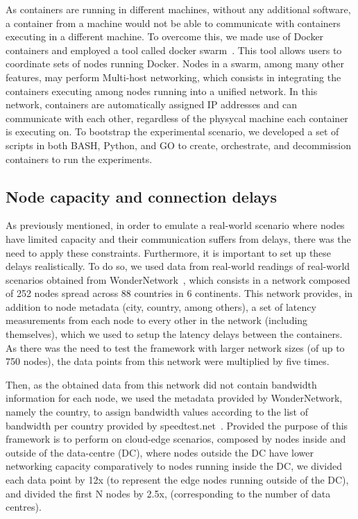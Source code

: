 As containers are running in different machines, without any additional software, a container from a machine would not be able to communicate with containers executing in a different machine. To overcome this, we made use of Docker~\cite{docker} containers and employed a tool called docker swarm~\cite{docker-swarm}. This tool allows users to coordinate sets of nodes running Docker. Nodes in a swarm, among many other features, may perform Multi-host networking, which consists in integrating the containers executing among nodes running into a unified network. In this network, containers are automatically assigned IP addresses and can communicate with each other, regardless of the physycal machine each container is executing on. To bootstrap the experimental scenario, we developed a set of scripts in both BASH, Python, and GO to create, orchestrate, and decommission containers to run the experiments.

\subsection{Node capacity and connection delays}

As previously mentioned, in order to emulate a real-world scenario where nodes have limited capacity and their communication suffers from delays, there was the need to apply these constraints. Furthermore, it is important to set up these delays realistically. To do so, we used data from real-world readings of real-world scenarios obtained from WonderNetwork~\cite{wondernetwork}, which consists in a network composed of 252 nodes spread across 88 countries in 6 continents. This network provides, in addition to node metadata (city, country, among others), a set of latency measurements from each node to every other in the network (including themselves), which we used to setup the latency delays between the containers. As there was the need to test the framework with larger network sizes (of up to 750 nodes), the data points from this network were multiplied by five times. 

Then, as the obtained data from this network did not contain bandwidth information for each node, we used the metadata provided by WonderNetwork, namely the country, to assign bandwidth values according to the list of bandwidth per country provided by speedtest.net~\cite{speedtest_global_index}. Provided the purpose of this framework is to perform on cloud-edge scenarios, composed by nodes inside and outside of the data-centre (DC), where nodes outside the DC have lower networking capacity comparatively to nodes running inside the DC, we divided each data point by 12x (to represent the edge nodes running outside of the DC), and divided the first N nodes by 2.5x, (corresponding to the number of data centres).


